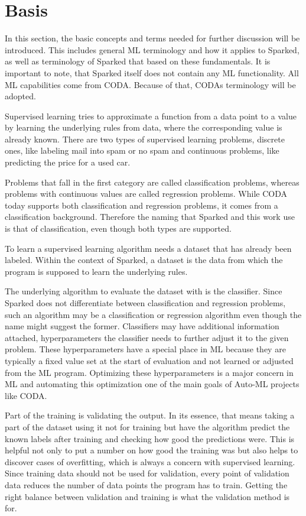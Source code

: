 \chapter{Basis}
In this section, the basic concepts and terms needed for further discussion will be introduced. This includes general ML terminology and how it applies to Sparked, as well as terminology of Sparked that based on these fundamentals. It is important to note, that Sparked itself does not contain any ML functionality. All ML capabilities come from CODA. Because of that, CODAs terminology will be adopted. 

Supervised learning tries to approximate a function from a data point to a value by learning the underlying rules from data, where the corresponding value is already known. There are two types of supervised learning problems, discrete ones, like labeling mail into spam or no spam and continuous problems, like predicting the price for a used car. 

Problems that fall in the first category are called classification problems, whereas problems with continuous values are called regression problems. While CODA today supports both classification and regression problems, it comes from a classification background. Therefore the naming that Sparked and this work use is that of classification, even though both types are supported.

To learn a supervised learning algorithm needs a dataset that has already been labeled. Within the context of Sparked, a dataset is the data from which the program is supposed to learn the underlying rules. 

The underlying algorithm to evaluate the dataset with is the classifier. Since Sparked does not differentiate between classification and regression problems, such an algorithm may be a classification or regression algorithm even though the name might suggest the former. Classifiers may have additional information attached, hyperparameters the classifier needs to further adjust it to the given problem. These hyperparameters have a special place in ML because they are typically a fixed value set at the start of evaluation and not learned or adjusted from the ML program. Optimizing these hyperparameters is a major concern in ML and automating this optimization one of the main goals of Auto-ML projects like CODA.

Part of the training is validating the output. In its essence, that means taking a part of the dataset using it not for training but have the algorithm predict the known labels after training and checking how good the predictions were. This is helpful not only to put a number on how good the training was but also helps to discover cases of overfitting, which is always a concern with supervised learning. Since training data should not be used for validation, every point of validation data reduces the number of data points the program has to train. Getting the right balance between validation and training is what the validation method is for. 

